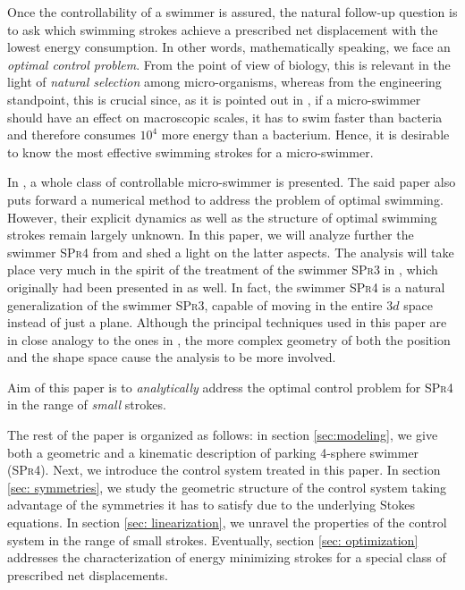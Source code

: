 Once the controllability of a swimmer is assured, the natural follow-up question is to ask which swimming strokes achieve a prescribed net displacement with the lowest energy consumption. In other words, mathematically speaking, we face an \emph{optimal control problem}. From the point of view of biology, this is relevant in the light of \emph{natural selection} among micro-organisms, whereas from the engineering standpoint, this is crucial since, as it is pointed out in \cite{Avron2004}, if a micro-swimmer should have an effect on macroscopic scales, it has to swim faster than bacteria and therefore consumes $10^4$ more energy than a bacterium. Hence, it is desirable to know the most effective swimming strokes for a micro-swimmer.

In \cite{Alouges2013}, a whole class of controllable micro-swimmer is presented. The said paper also puts forward a numerical method to address the problem of optimal swimming. However, their explicit dynamics as well as the structure of optimal swimming strokes remain largely unknown. In this paper, we will analyze further the swimmer \textsc{SPr4} from \cite{Alouges2013} and shed a light on the latter aspects. The analysis will take place very much in the spirit of the treatment of the swimmer \textsc{SPr3} in \cite{Alouges2017}, which originally had been presented in \cite{Alouges2013} as well. In fact, the swimmer \textsc{SPr4} is a natural generalization of the swimmer \textsc{SPr3}, capable of moving in the entire $3d$ space instead of just a plane. Although the principal techniques used in this paper are in close analogy to the ones in \cite{Alouges2017}, the more complex geometry of both the position and the shape space cause the analysis to be more involved.

Aim of this paper is to \emph{analytically} address the optimal control problem for \textsc{SPr4} in the range of \emph{small} strokes.

The rest of the paper is organized as follows: in section \ref{sec:modeling}, we give both a geometric and a kinematic description of parking 4-sphere swimmer (\textsc{SPr4}). Next, we introduce the control system treated in this paper. In section \ref{sec: symmetries}, we study the geometric structure of the control system taking advantage of the symmetries it has to satisfy due to the underlying Stokes  equations. In section \ref{sec: linearization}, we unravel the properties of the control system in the range of small strokes. Eventually, section \ref{sec: optimization} addresses the characterization of energy minimizing strokes for a special class of prescribed net displacements.




